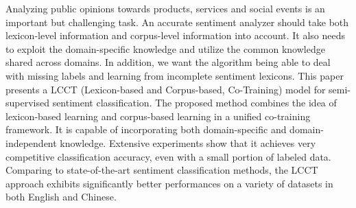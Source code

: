 Analyzing public opinions towards products, services and social events is an important but challenging task. An accurate sentiment analyzer should take both lexicon-level information and corpus-level information into account. It also needs to exploit the domain-specific knowledge and utilize the common knowledge shared across domains. In addition, we want the algorithm being able to deal with missing labels and learning from incomplete sentiment lexicons. This paper presents a LCCT (Lexicon-based and Corpus-based, Co-Training) model for semi-supervised sentiment classification. The proposed method combines the idea of lexicon-based learning and corpus-based learning in a unified co-training framework. It is capable of incorporating both domain-specific and domain-independent knowledge. Extensive experiments show that it achieves very competitive classification accuracy, even with a small portion of labeled data. Comparing to state-of-the-art sentiment classification methods, the LCCT approach exhibits significantly better performances on a variety of datasets in both English and Chinese.
